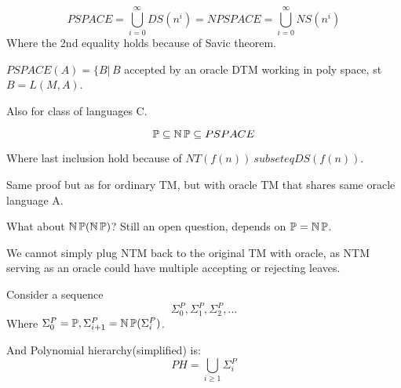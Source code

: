 \begin{definition}
	\[ PSPACE = \bigcup_{i = 0}^{\infty} DS(n^i) = NPSPACE = \bigcup_{i = 0}^{\infty} NS(n^i) \]
	Where the 2nd equality holds because of Savic theorem.
\end{definition}

\begin{definition}
	$PSPACE(A) = \{ B | \, B$ accepted by an oracle DTM working in poly space, st $B = L(M, A)$.

	Also for class of languages C.
\end{definition}

\begin{note}
	\[ \operatorname{\mathbb{P}} \subseteq \operatorname{\operatorname{\mathbb{N}}\mathbb{P}} \subseteq PSPACE \]

	Where last inclusion hold because of $NT(f(n)) \ subseteq DS(f(n))$.

	Same proof but as for ordinary TM, but with oracle TM that shares same oracle language A.
\end{note}

\begin{observation}
	What about $\operatorname{\operatorname{\mathbb{N}}\mathbb{P}}(\operatorname{\operatorname{\mathbb{N}}\mathbb{P}})$? Still an open question, depends on $\operatorname{\mathbb{P}} = \operatorname{\operatorname{\mathbb{N}}\mathbb{P}}$.

	We cannot simply plug NTM back to the original TM with oracle, as NTM serving as an oracle could have multiple accepting or rejecting leaves.
\end{observation}

\begin{definition}
	Consider a sequence
	\[ \Sigma_0^P, \Sigma_1^P, \Sigma_2^P, ... \]
	Where $\Sigma_0^P = \operatorname{\mathbb{P}}, \Sigma_{i + 1}^P = \operatorname{\operatorname{\mathbb{N}}\mathbb{P}}(\Sigma_i^P)$.

	And Polynomial hierarchy(simplified) is:
	\[ PH = \bigcup_{i \geq 1} \Sigma_i^P \]
\end{definition}

